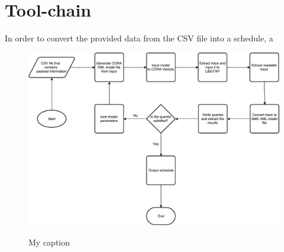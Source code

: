 \section{Tool-chain} \label{sec:tool_chain}
In order to convert the provided data from the CSV file into a schedule, a 
\begin{figure}
	\includegraphics{graphics/tool_chain.pdf}
	\label{img:tool_chain}
	\caption{My caption}
\end{figure}